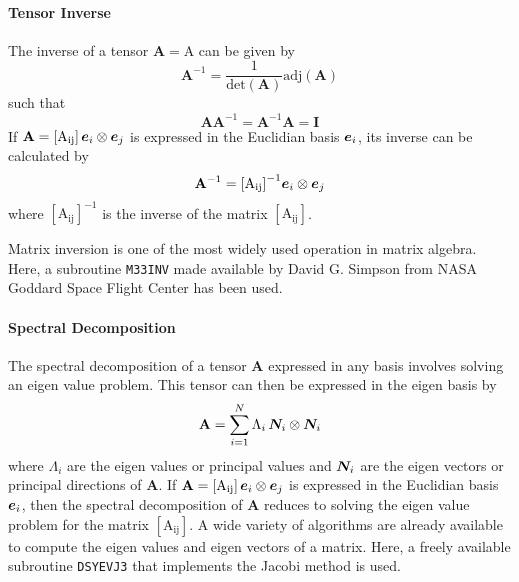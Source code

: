 \paragraph*{Tensor Inverse}
The inverse of a tensor \(\mathbf{A} = \mathrm{A}\) can be given by
\begin{equation}
    \mathbf{A}^{-1} = \frac{1}{\text{det}(\mathbf{A})} \text{adj}(\mathbf{A})
\end{equation}
such that
\begin{equation}
    \mathbf{A} \mathbf{A}^{-1} = \mathbf{A}^{-1} \mathbf{A} = \mathbf{I}
\end{equation} 
If \(\mathbf{A} = \mathrm{\left[A_{ij}\right]}\, \bm{e}_{i}\otimes \bm{e}_{j}\) is expressed in the Euclidian basis \(\bm{e}_{i}\), its inverse can be calculated by
\begin{equation}
    \mathbf{A}^{-1} = \mathrm{\left[A_{ij}\right]^{-1}} \bm{e}_{i}\otimes \bm{e}_{j}
\end{equation} 
where \(\mathrm{\left[A_{ij}\right]^{-1}}\) is the inverse of the matrix \(\mathrm{\left[A_{ij}\right]}\).

Matrix inversion is one of the most widely used operation in matrix algebra. Here, a subroutine \texttt{M33INV} made available by David G. Simpson from 
NASA Goddard Space Flight Center has been used.


\paragraph*{Spectral Decomposition}
The spectral decomposition of a tensor \(\mathbf{A}\) expressed in any basis involves solving an eigen value problem. This tensor can then be expressed in the eigen basis by
\begin{equation}
    \mathbf{A} = \sum_{i=1}^{N} \Lambda_{i}\, \bm{N}_{i} \otimes \bm{N}_{i}
\end{equation}
where \(\Lambda_{i}\) are the eigen values or principal values and \(\bm{N}_{i}\) are the eigen vectors or principal directions of \(\mathbf{A}\). If \(\mathbf{A} = \mathrm{\left[A_{ij}\right]}\, \bm{e}_{i}\otimes \bm{e}_{j}\) is expressed in the Euclidian basis \(\bm{e}_{i}\), then the spectral decomposition of \(\mathbf{A}\) reduces to solving the eigen value problem for the matrix \(\mathrm{\left[A_{ij}\right]}\). A wide variety of algorithms are already available to compute the eigen values and eigen vectors of a matrix. Here, a freely available subroutine \texttt{DSYEVJ3} \cite{Kopp2006Oct} that implements the Jacobi method is used.

